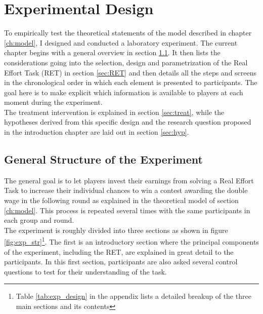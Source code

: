     \chapter{Experimental Design}
    \label{ch:experiment}
    \thispagestyle{fancy}
    
    To empirically test the theoretical statements of the model described in chapter \ref{ch:model}, I designed and conducted a laboratory experiment. The current chapter begins with a general overview in section \ref{sec:gen_str}. It then lists the considerations going into the selection, design and parametrization of the Real Effort Task (RET) in section \ref{sec:RET} and then details all the steps and screens in the chronological order in which each element is presented to participants. The goal here is to make explicit which information is available to players at each moment during the experiment.\\
    
    The treatment intervention is explained in section \ref{sec:treat}, while the hypotheses derived from this specific design and the research question proposed in the introduction chapter are laid out in section \ref{sec:hyp}.
    
    \section{General Structure of the Experiment}
    \label{sec:gen_str}
    
    The general goal is to let players invest their earnings from solving a Real Effort Task to increase their individual chances to win a contest awarding the double wage in the following round as explained in the theoretical model of section \ref{ch:model}. This process is repeated several times with the same participants in each group and round.\\ 
    
    
    The experiment is roughly divided into three sections as shown in figure \ref{fig:exp_str}\footnote{ Table \ref{tab:exp_design} in the appendix lists a detailed breakup of the three main sections and its contents}. The first is an introductory section where the principal components of the experiment, including the RET, are explained in great detail to the participants. In this first section, participants are also asked several control questions to test for their understanding of the task.\\
    
